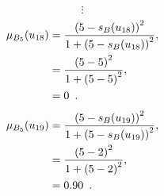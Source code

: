 \documentclass[a4paper,openany]{book}
\begin{document}
				\[
					\vdots
				\]
				\begin{align}
					\mu_{B_5}(u_{18}) &= \frac{\left(5-s_B(u_{18})\right)^2}{1 + \left(5-s_B(u_{18})\right)^2} ,\\
					&= \frac{\left(5-5\right)^2}{1 + \left(5-5\right)^2} \notag ,\\
					&= 0 \enspace. \notag
				\end{align}
				\begin{align}
					\mu_{B_5}(u_{19}) &= \frac{\left(5-s_B(u_{19})\right)^2}{1 + \left(5-s_B(u_{19})\right)^2} ,\\
					&= \frac{\left(5-2\right)^2}{1 + \left(5-2\right)^2} \notag ,\\
					&= 0.90 \enspace. \notag
				\end{align}
\end{document}
